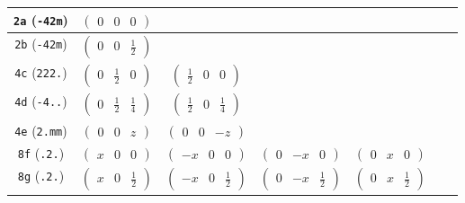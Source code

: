 \documentclass[fleqn,9pt,landscape]{jsarticle}
\begin{document}
\begin{center}
\begin{longtable}{ccccccc}
{\tt 2a} ({\tt -42m}) & $ \begin{pmatrix} 0 & 0 & 0 \end{pmatrix} $ & $  $ & $  $ & $  $ & $  $ & $  $ \\ \hline
{\tt 2b} ({\tt -42m}) & $ \begin{pmatrix} 0 & 0 & \frac{1}{2} \end{pmatrix} $ & $  $ & $  $ & $  $ & $  $ & $  $ \\ \hline
{\tt 4c} ({\tt 222.}) & $ \begin{pmatrix} 0 & \frac{1}{2} & 0 \end{pmatrix} $ & $ \begin{pmatrix} \frac{1}{2} & 0 & 0 \end{pmatrix} $ & $  $ & $  $ & $  $ & $  $ \\ \hline
{\tt 4d} ({\tt -4..}) & $ \begin{pmatrix} 0 & \frac{1}{2} & \frac{1}{4} \end{pmatrix} $ & $ \begin{pmatrix} \frac{1}{2} & 0 & \frac{1}{4} \end{pmatrix} $ & $  $ & $  $ & $  $ & $  $ \\ \hline
{\tt 4e} ({\tt 2.mm}) & $ \begin{pmatrix} 0 & 0 & z \end{pmatrix} $ & $ \begin{pmatrix} 0 & 0 & - z \end{pmatrix} $ & $  $ & $  $ & $  $ & $  $ \\ \hline
{\tt 8f} ({\tt .2.}) & $ \begin{pmatrix} x & 0 & 0 \end{pmatrix} $ & $ \begin{pmatrix} - x & 0 & 0 \end{pmatrix} $ & $ \begin{pmatrix} 0 & - x & 0 \end{pmatrix} $ & $ \begin{pmatrix} 0 & x & 0 \end{pmatrix} $ & $  $ & $  $ \\ \hline
{\tt 8g} ({\tt .2.}) & $ \begin{pmatrix} x & 0 & \frac{1}{2} \end{pmatrix} $ & $ \begin{pmatrix} - x & 0 & \frac{1}{2} \end{pmatrix} $ & $ \begin{pmatrix} 0 & - x & \frac{1}{2} \end{pmatrix} $ & $ \begin{pmatrix} 0 & x & \frac{1}{2} \end{pmatrix} $ & $  $ & $  $ \\ \hline

\end{longtable}
\end{center}
\end{document}
